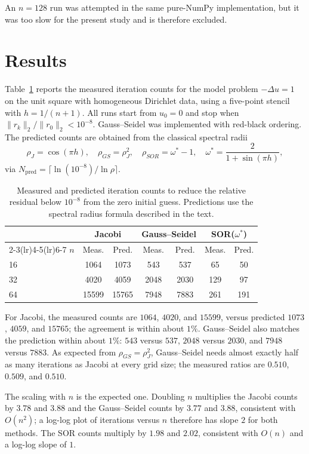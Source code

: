 \documentclass[11pt]{article}
\begin{document}
An $n=128$ run was attempted in the same pure-NumPy implementation, but it was too slow for the present study and is therefore excluded.
\section{Results}
Table~\ref{tab:results} reports the measured iteration counts for the model problem $-\Delta u=1$ on the unit square with homogeneous Dirichlet data, using a five-point stencil with $h=1/(n+1)$. All runs start from $u_0=0$ and stop when $\lVert r_k\rVert_2/\lVert r_0\rVert_2<10^{-8}$. Gauss--Seidel was implemented with red-black ordering. The predicted counts are obtained from the classical spectral radii
\[\rho_J=\cos(\pi h),\quad \rho_{GS}=\rho_J^2,\quad \rho_{SOR}=\omega^*-1,\quad \omega^*=\frac{2}{1+\sin(\pi h)},\]
via $N_{\mathrm{pred}}=\lceil \ln(10^{-8})/\ln\rho\rceil$.

\begin{table}[htbp]
\centering
\begin{tabular}{lcccccc}
\toprule
 & \multicolumn{2}{c}{Jacobi} & \multicolumn{2}{c}{Gauss--Seidel} & \multicolumn{2}{c}{SOR($\omega^*$)} \\
\cmidrule(lr){2-3}\cmidrule(lr){4-5}\cmidrule(lr){6-7}
$n$ & Meas. & Pred. & Meas. & Pred. & Meas. & Pred. \\
\midrule
16 & 1064 & 1073 & 543 & 537 & 65 & 50 \\
32 & 4020 & 4059 & 2048 & 2030 & 129 & 97 \\
64 & 15599 & 15765 & 7948 & 7883 & 261 & 191 \\
\bottomrule
\end{tabular}
\caption{Measured and predicted iteration counts to reduce the relative residual below $10^{-8}$ from the zero initial guess. Predictions use the spectral radius formula described in the text.}
\label{tab:results}
\end{table}

For Jacobi, the measured counts are $1064$, $4020$, and $15599$, versus predicted $1073$, $4059$, and $15765$; the agreement is within about $1\%$. Gauss--Seidel also matches the prediction within about $1\%$: $543$ versus $537$, $2048$ versus $2030$, and $7948$ versus $7883$. As expected from $\rho_{GS}=\rho_J^2$, Gauss--Seidel needs almost exactly half as many iterations as Jacobi at every grid size; the measured ratios are $0.510$, $0.509$, and $0.510$.

The scaling with $n$ is the expected one. Doubling $n$ multiplies the Jacobi counts by $3.78$ and $3.88$ and the Gauss--Seidel counts by $3.77$ and $3.88$, consistent with $O(n^2)$; a log-log plot of iterations versus $n$ therefore has slope $2$ for both methods. The SOR counts multiply by $1.98$ and $2.02$, consistent with $O(n)$ and a log-log slope of $1$.
\end{document}
